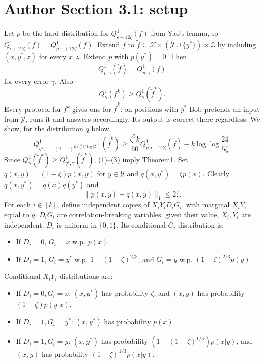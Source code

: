 \documentclass[10pt,a4paper]{article}
\begin{document}
\section*{Author Section 3.1: setup}
Let $p$ be the hard distribution for $Q^1_{\epsilon+12\zeta}(f)$ from Yao's lemma, so $Q^1_{\epsilon+12\zeta}(f)=Q^1_{p,\epsilon+12\zeta}(f)$. Extend $f$ to $\widetilde f\subseteq\mathcal X\times(\mathcal Y\cup\{y^*\})\times\mathcal Z$ by including $(x,y^*,z)$ for every $x,z$. Extend $p$ with $p(y^*)=0$. Then
\[Q^1_{p,\gamma}(\widetilde f)=Q^1_{p,\gamma}(f)\tag{1}\]
for every error $\gamma$. Also
\[Q^1_\gamma(f^k)\ge Q^1_\gamma(\widetilde f^k).\tag{2}\]
Every protocol for $f^k$ gives one for $\widetilde f^k$: on positions with $y^*$ Bob pretends an input from $\mathcal Y$, runs it and answers accordingly. Its output is correct there regardless. We show, for the distribution $q$ below,
\[Q^1_{q^k,1-(1-\epsilon)^{\Omega(\zeta^6k/\log|\mathcal Z|)}}(\widetilde f^k)\ge\frac{\zeta^5k}{60}Q^1_{p,\epsilon+12\zeta}(\widetilde f)-k\log\log\frac{24}{5\zeta}.\tag{3}\]
Since $Q^1_\gamma(\widetilde f^k)\ge Q^1_{q^k,\gamma}(\widetilde f^k)$, (1)--(3) imply Theorem1. Set $q(x,y)=(1-\zeta)p(x,y)$ for $y\in\mathcal Y$ and $q(x,y^*)=\zeta p(x)$. Clearly $q(x,y^*)=q(x)q(y^*)$ and
\[\|p(x,y)-q(x,y)\|_1\le2\zeta.\tag{4}\]
For each $i\in[k]$, define independent copies of $X_iY_iD_iG_i$, with marginal $X_iY_i$ equal to $q$. $D_iG_i$ are correlation-breaking variables: given their value, $X_i,Y_i$ are independent. $D_i$ is uniform in $\{0,1\}$. Its conditional $G_i$ distribution is:
\begin{itemize}\item If $D_i=0$, $G_i=x$ w.p. $p(x)$.
\item If $D_i=1$, $G_i=y^*$ w.p. $1-(1-\zeta)^{2/3}$, and $G_i=y$ w.p. $(1-\zeta)^{2/3}p(y)$.\end{itemize}
Conditional $X_iY_i$ distributions are:
\begin{itemize}\item If $D_i=0,G_i=x$: $(x,y^*)$ has probability $\zeta$, and $(x,y)$ has probability $(1-\zeta)p(y|x)$.
\item If $D_i=1,G_i=y^*$: $(x,y^*)$ has probability $p(x)$.
\item If $D_i=1,G_i=y$: $(x,y^*)$ has probability $(1-(1-\zeta)^{1/3})p(x|y)$, and $(x,y)$ has probability $(1-\zeta)^{1/3}p(x|y)$.\end{itemize}
\end{document}

